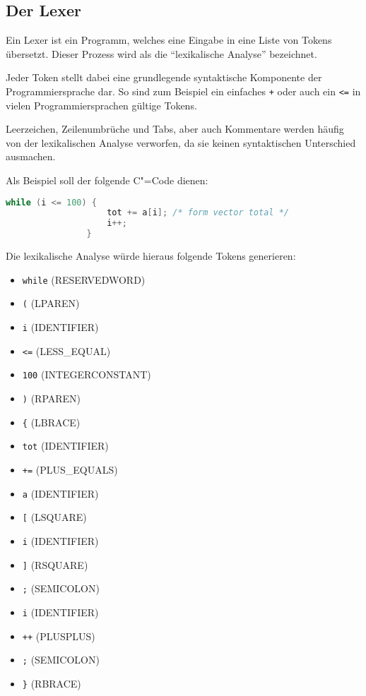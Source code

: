         \subsection{Der Lexer}
            Ein Lexer ist ein Programm,
            welches eine Eingabe in eine Liste von Tokens übersetzt.
            Dieser Prozess wird als die
            \enquote{lexikalische Analyse} bezeichnet.

            Jeder Token stellt dabei eine grundlegende syntaktische Komponente der Programmiersprache dar.
            So sind zum Beispiel ein einfaches
            \verb|+| oder
            auch ein
            \verb|<=| in vielen Programmiersprachen gültige Tokens.

            Leerzeichen,
            Zeilenumbrüche und
            Tabs,
            aber auch Kommentare werden häufig von der lexikalischen Analyse verworfen,
            da sie keinen syntaktischen Unterschied ausmachen.\cite[38]{Watson2017}

            Als Beispiel soll der folgende C"=Code dienen:\cite[38]{Watson2017}

            \begin{lstlisting}[caption={Beispiel C-Code}, label={lst:Beispiel_C_Code}, gobble=16,
                language=C]
                while (i <= 100) {
                    tot += a[i]; /* form vector total */
                    i++;
                }
            \end{lstlisting}

            Die lexikalische Analyse würde hieraus folgende Tokens generieren:

            \begin{itemize}
                \item \verb|while| (RESERVEDWORD)
                \item \verb|(| (LPAREN)
                \item \verb|i| (IDENTIFIER)
                \item \verb|<=| (LESS\_EQUAL)
                \item \verb|100| (INTEGERCONSTANT)
                \item \verb|)| (RPAREN)
                \item \verb|{| (LBRACE)
                \item \verb|tot| (IDENTIFIER)
                \item \verb|+=| (PLUS\_EQUALS)
                \item \verb|a| (IDENTIFIER)
                \item \verb|[| (LSQUARE)
                \item \verb|i| (IDENTIFIER)
                \item \verb|]| (RSQUARE)
                \item \verb|;| (SEMICOLON)
                \item \verb|i| (IDENTIFIER)
                \item \verb|++| (PLUSPLUS)
                \item \verb|;| (SEMICOLON)
                \item \verb|}| (RBRACE)
            \end{itemize}

